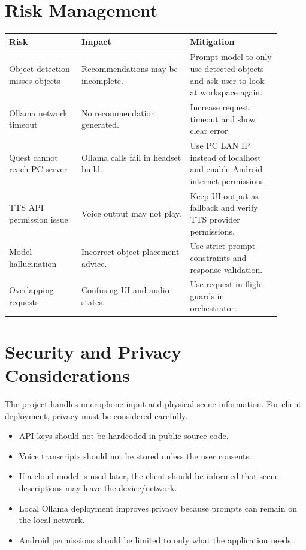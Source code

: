 \documentclass[12pt,a4paper]{article}
\begin{document}
\section{Risk Management}

\begin{longtable}{p{0.24\linewidth} p{0.36\linewidth} p{0.30\linewidth}}
\toprule
\textbf{Risk} & \textbf{Impact} & \textbf{Mitigation}\\
\midrule
Object detection misses objects & Recommendations may be incomplete. & Prompt model to only use detected objects and ask user to look at workspace again.\\
Ollama network timeout & No recommendation generated. & Increase request timeout and show clear error.\\
Quest cannot reach PC server & Ollama calls fail in headset build. & Use PC LAN IP instead of localhost and enable Android internet permissions.\\
TTS API permission issue & Voice output may not play. & Keep UI output as fallback and verify TTS provider permissions.\\
Model hallucination & Incorrect object placement advice. & Use strict prompt constraints and response validation.\\
Overlapping requests & Confusing UI and audio states. & Use request-in-flight guards in orchestrator.\\
\bottomrule
\end{longtable}

\section{Security and Privacy Considerations}

The project handles microphone input and physical scene information. For client deployment, privacy must be considered carefully.

\begin{itemize}
    \item API keys should not be hardcoded in public source code.
    \item Voice transcripts should not be stored unless the user consents.
    \item If a cloud model is used later, the client should be informed that scene descriptions may leave the device/network.
    \item Local Ollama deployment improves privacy because prompts can remain on the local network.
    \item Android permissions should be limited to only what the application needs.
\end{itemize}
\end{document}
